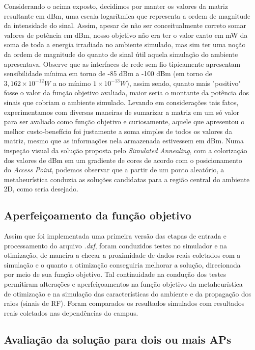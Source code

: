 \documentclass[
	12pt,				%
	openright,			%
	twoside,			%
	a4paper,			%
	english,			%
	french,				%
	spanish,			%
	brazil				%
	]{abntex2}
\begin{document}
Considerando o acima exposto, decidimos por manter os valores da matriz resultante em dBm, uma escala logarítmica que representa a ordem de magnitude da intensidade do sinal. Assim, apesar de não ser conceitualmente correto somar valores de potência em dBm, nosso objetivo não era ter o valor exato em mW da soma de toda a energia irradiada no ambiente simulado, mas sim ter uma noção da ordem de magnitude do quanto de sinal útil aquela simulação do ambiente apresentava. Observe que as interfaces de rede sem fio tipicamente apresentam sensibilidade mínima em torno de -85 dBm a -100 dBm (em torno de $ 3,162\times10^{-12} W $ a no mínimo $ 1\times10^{-13} W $), assim sendo, quanto mais "positivo" fosse o valor da função objetivo avaliada, maior seria o montante da potência dos sinais que cobriam o ambiente simulado. Levando em considerações tais fatos, experimentamos com diversas maneiras de sumarizar a matriz em um só valor para ser avaliado como função objetivo e curiosamente, aquele que apresentou o melhor custo-benefício foi justamente a soma simples de todos os valores da matriz, mesmo que as informações nela armazenada estivessem em dBm. Numa inspeção visual da solução proposta pelo \textit{Simulated Annealing}, com a colorização dos valores de dBm em um gradiente de cores de acordo com o posicionamento do \textit{Access Point}, podemos observar que a partir de um ponto aleatório, a metaheurística conduzia as soluções candidatas para a região central do ambiente 2D, como seria desejado.


\subsection[Aperfeiçoamento da função objetivo ]{Aperfeiçoamento da função objetivo }

Assim que foi implementada uma primeira versão das etapas de entrada e processamento do arquivo \textit{.dxf}, foram conduzidos testes no simulador e na otimização, de maneira a checar a proximidade de dados reais coletados com a simulação e o quanto a otimização conseguiria melhorar a solução, direcionada por meio de sua função objetivo. Tal continuidade na condução dos testes permitiram alterações e aperfeiçoamentos na função objetivo da metaheurística de otimização e na simulação das características do ambiente e da propagação dos raios (sinais de RF). Foram comparados os resultados simulados com resultados reais coletados nas dependências do campus. 

\subsection[Avaliação da solução para dois ou mais APs]{Avaliação da solução para dois ou mais APs}
\end{document}
